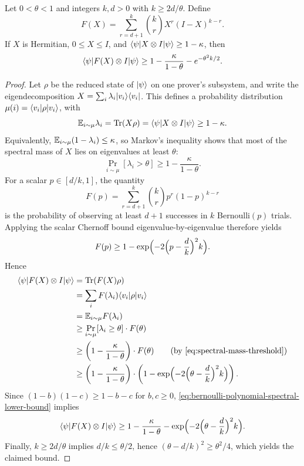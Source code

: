 \begin{lemma}\label{lem:chernoff-bernoulli-matrix}
	\leanok
	Let $0<\theta<1$ and integers $k,d>0$ with $k \ge 2d/\theta$. Define
	\[
		F(X) = \sum_{r=d+1}^k \binom{k}{r} X^r (I-X)^{k-r}.
	\]
	If $X$ is Hermitian, $0 \le X \le I$, and $\langle \psi \rvert X \otimes I \lvert \psi \rangle \ge 1-\kappa$, then
	\[
		\langle \psi \rvert F(X) \otimes I \lvert \psi \rangle
		\ge
		1 - \frac{\kappa}{1-\theta} - e^{-\theta^2 k/2}.
	\]
\end{lemma}
\begin{proof}
	\leanok
	Let $\rho$ be the reduced state of $\lvert \psi \rangle$ on one prover's subsystem, and write the eigendecomposition $X = \sum_i \lambda_i \lvert v_i \rangle\langle v_i \rvert$. This defines a probability distribution $\mu(i)=\langle v_i \rvert\rho\lvert v_i \rangle$, with
	\[
		\mathbb{E}_{i\sim\mu} \lambda_i = \operatorname{Tr}(X\rho) = \langle \psi \rvert X \otimes I \lvert \psi \rangle \ge 1-\kappa.
	\]
	Equivalently, $\mathbb{E}_{i\sim\mu}(1-\lambda_i)\le \kappa$, so Markov's inequality
	shows that most of the spectral mass of $X$ lies on eigenvalues at least
	$\theta$:
	\begin{equation}\label{eq:spectral-mass-threshold}
		\Pr_{i\sim\mu}[\lambda_i > \theta] \ge 1-\frac{\kappa}{1-\theta}.
	\end{equation}
	For a scalar $p \in [d/k,1]$, the quantity
	\[
		F(p)=\sum_{r=d+1}^k \binom{k}{r}p^r(1-p)^{k-r}
	\]
	is the probability of observing at least $d+1$ successes in $k$
	Bernoulli$(p)$ trials. Applying the scalar Chernoff bound
	eigenvalue-by-eigenvalue therefore yields
	\begin{equation}\label{eq:bernoulli-tail-chernoff}
		F(p) \ge 1-\exp\Bigl(-2\Bigl(p-\frac{d}{k}\Bigr)^2k\Bigr).
	\end{equation}
	Hence
	\begin{align}
		\bra{\psi} F(X) \ot I \ket{\psi}
		 & = \Tr(F(X)\rho)\nonumber                                         \\
		 & = \sum_i F(\lambda_i)\bra{v_i}\rho\ket{v_i}\nonumber             \\
		 & = \E_{i\sim\mu} F(\lambda_i)\nonumber                            \\
		 & \ge \Pr_{i\sim\mu}[\lambda_i \ge \theta]\cdot F(\theta)\nonumber \\
		 & \ge \left(1-\frac{\kappa}{1-\theta}\right)\cdot F(\theta)
		\tag{by \ref{eq:spectral-mass-threshold}}\nonumber                           \\
		 & \ge \left(1-\frac{\kappa}{1-\theta}\right)\cdot
		\left(1-\exp\Bigl(-2\Bigl(\theta-\frac{d}{k}\Bigr)^2k\Bigr)\right).
		\label{eq:bernoulli-polynomial-spectral-lower-bound}
	\end{align}
	Since $(1-b)(1-c)\ge 1-b-c$ for $b,c\ge 0$, \ref{eq:bernoulli-polynomial-spectral-lower-bound} implies
	\[
		\langle \psi \rvert F(X) \otimes I \lvert \psi \rangle
		\ge
		1-\frac{\kappa}{1-\theta}
		- \exp\Bigl(-2\Bigl(\theta-\frac{d}{k}\Bigr)^2k\Bigr).
	\]
	Finally, $k \ge 2d/\theta$ implies $d/k \le \theta/2$, hence $(\theta-d/k)^2 \ge \theta^2/4$, which yields the claimed bound.
\end{proof}

